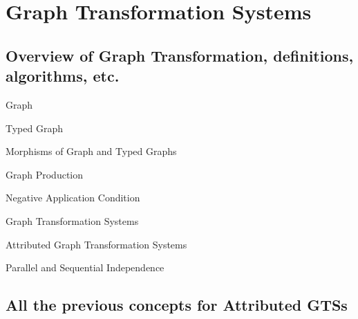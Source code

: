 \chapter{Graph Transformation Systems}

\section{Overview of Graph Transformation, definitions, algorithms, etc.}

\begin{mydef}{Graph}
\end{mydef}

\begin{mydef}{Typed Graph}
\end{mydef}

\begin{mydef}{Morphisms of Graph and Typed Graphs}
\end{mydef}


\begin{mydef}{Graph Production}
\end{mydef}

\begin{mydef}{Negative Application Condition}

\centerline{}

\end{mydef}

\begin{mydef}{Graph Transformation Systems}
\end{mydef}

\begin{mydef}{Attributed Graph Transformation Systems}
\end{mydef}

\begin{mydef}{Parallel and Sequential Independence}
\end{mydef}


\section{All the previous concepts for Attributed GTSs}
